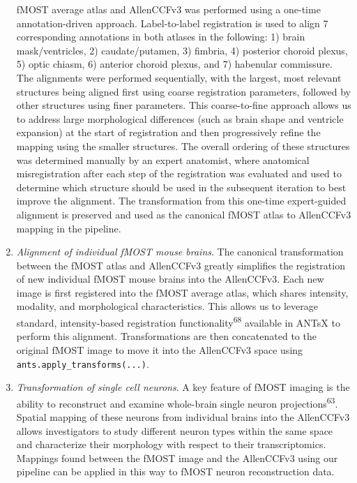 \documentclass[
  12pt,
]{article}
\begin{document}
\begin{enumerate}
  fMOST average atlas and AllenCCFv3 was performed using a one-time
  annotation-driven approach. Label-to-label registration is used to
  align 7 corresponding annotations in both atlases in the following: 1)
  brain mask/ventricles, 2) caudate/putamen, 3) fimbria, 4) posterior
  choroid plexus, 5) optic chiasm, 6) anterior choroid plexus, and 7)
  habenular commissure. The alignments were performed sequentially, with
  the largest, most relevant structures being aligned first using coarse
  registration parameters, followed by other structures using finer
  parameters. This coarse-to-fine approach allows us to address large
  morphological differences (such as brain shape and ventricle
  expansion) at the start of registration and then progressively refine
  the mapping using the smaller structures. The overall ordering of
  these structures was determined manually by an expert anatomist, where
  anatomical misregistration after each step of the registration was
  evaluated and used to determine which structure should be used in the
  subsequent iteration to best improve the alignment. The transformation
  from this one-time expert-guided alignment is preserved and used as
  the canonical fMOST atlas to AllenCCFv3 mapping in the pipeline.
\item
  \emph{Alignment of individual fMOST mouse brains}. The canonical
  transformation between the fMOST atlas and AllenCCFv3 greatly
  simplifies the registration of new individual fMOST mouse brains into
  the AllenCCFv3. Each new image is first registered into the fMOST
  average atlas, which shares intensity, modality, and morphological
  characteristics. This allows us to leverage standard, intensity-based
  registration functionality\textsuperscript{68} available in ANTsX to
  perform this alignment. Transformations are then concatenated to the
  original fMOST image to move it into the AllenCCFv3 space using
  \texttt{ants.apply\_transforms(...)}.
\item
  \emph{Transformation of single cell neurons}. A key feature of fMOST
  imaging is the ability to reconstruct and examine whole-brain single
  neuron projections\textsuperscript{63}. Spatial mapping of these
  neurons from individual brains into the AllenCCFv3 allows
  investigators to study different neuron types within the same space
  and characterize their morphology with respect to their
  transcriptomics. Mappings found between the fMOST image and the
  AllenCCFv3 using our pipeline can be applied in this way to fMOST
  neuron reconstruction data.
\end{enumerate}
\end{document}
